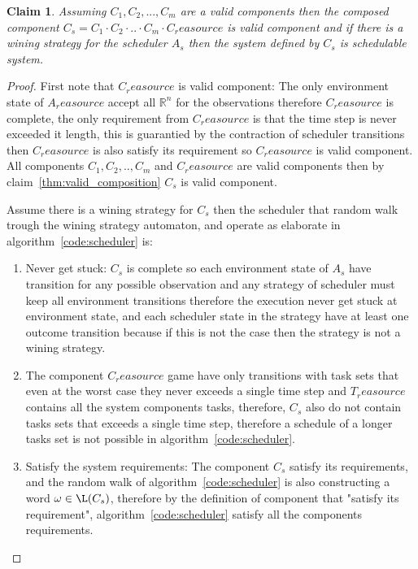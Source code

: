 \documentclass[ twoside, 12pt ]{article}
\newcommand\R{{\mathbb R}}
\newtheorem{claim}[thm]{Claim}
\begin{document}
\begin{claim}
    Assuming $C_1,C_2, ... , C_m$ are a valid components then the composed component $C_s=C_1 \cdot C_2 \cdot .. \cdot C_m \cdot C_reasource $ is valid component and if there is a wining strategy for the scheduler $A_s$ then the system defined by $C_s$ is schedulable system.
\end{claim}
\begin{proof}
    First note that $C_reasource$ is valid component:
    The only environment state of $A_reasource$ accept all $\R^n$ for the observations therefore $C_reasource$ is complete, the only requirement from $C_reasource$ is that the time step is never exceeded it length, this is guarantied by the contraction of scheduler transitions then $C_reasource$ is also satisfy its requirement so $C_reasource$ is valid component.
    All components $C_1 , C_2 , .. , C_m$ and $C_reasource $ are valid components then by claim~\ref{thm:valid_composition} $C_s $ is valid component.
    
    Assume there is a wining strategy for $C_s$ then the scheduler that random walk trough the wining strategy automaton, and operate as elaborate in algorithm~\ref{code:scheduler} is:
    \begin{enumerate}
        \item Never get stuck: $C_s$ is complete so each environment state of $A_s$ have transition for any possible observation and any strategy of scheduler must keep all environment transitions therefore the execution never get stuck at environment state, and each scheduler state in the strategy have at least one outcome transition because if this is not the case then the strategy is not a wining strategy. 
        
        \item The component $C_reasource$ game have only transitions with task sets that even at the worst case they never exceeds a single time step and $T_reasource$ contains all the system components tasks, therefore, $C_s$ also do not contain tasks sets that exceeds a single time step, therefore a schedule of a longer tasks set is not possible in algorithm~\ref{code:scheduler}.
        
        \item Satisfy the system requirements: The component $C_s$ satisfy its requirements, and the random walk of algorithm~\ref{code:scheduler} is also constructing a word $\omega \in \L(C_s)$, therefore by the definition of component that "satisfy its requirement", algorithm~\ref{code:scheduler} satisfy all the components requirements.
    \end{enumerate}
\end{proof}
\end{document}
